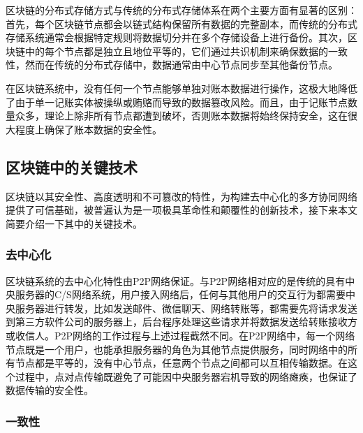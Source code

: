 区块链的分布式存储方式与传统的分布式存储体系在两个主要方面有显著的区别：首先，每个区块链节点都会以链式结构保留所有数据的完整副本，而传统的分布式存储系统通常会根据特定规则将数据切分并在多个存储设备上进行备份。其次，区块链中的每个节点都是独立且地位平等的，它们通过共识机制来确保数据的一致性，然而在传统的分布式存储中，数据通常由中心节点同步至其他备份节点。

在区块链系统中，没有任何一个节点能够单独对账本数据进行操作，这极大地降低了由于单一记账实体被操纵或贿赂而导致的数据篡改风险。而且，由于记账节点数量众多，理论上除非所有节点都遭到破坏，否则账本数据将始终保持安全，这在很大程度上确保了账本数据的安全性。

\subsection{区块链中的关键技术}
\label{sec:区块链中的关键技术}
区块链以其安全性、高度透明和不可篡改的特性，为构建去中心化的多方协同网络提供了可信基础，被普遍认为是一项极具革命性和颠覆性的创新技术，接下来本文简要介绍一下其中的关键技术。
\subsubsection{去中心化}
    
    区块链系统的去中心化特性由P2P网络保证。与P2P网络相对应的是传统的具有中央服务器的C/S网络系统，用户接入网络后，任何与其他用户的交互行为都需要中央服务器进行转发，比如发送邮件、微信聊天、网络转账等，都需要先将请求发送到第三方软件公司的服务器上，后台程序处理这些请求并将数据发送给转账接收方或收信人。P2P网络的工作过程与上述过程截然不同。在P2P网络中，每一个网络节点既是一个用户，也能承担服务器的角色为其他节点提供服务，同时网络中的所有节点都是平等的，没有中心节点，任意两个节点之间都可以互相传输数据。在这个过程中，点对点传输既避免了可能因中央服务器宕机导致的网络瘫痪，也保证了数据传输的安全性。
    \subsubsection{一致性}
    
